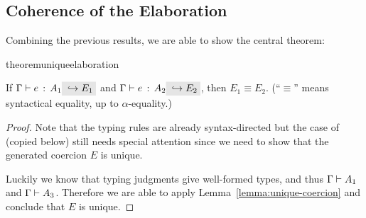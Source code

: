 %
%
%
%




\subsection{Coherence of the Elaboration}
Combining the previous results, we are able to show the central theorem:

\begin{restatable}{theorem}{uniqueelaboration}
  \label{theorem:unique-elaboration}

  If $\jtype \Gamma e {A_1} \yields {E_1}$ and $\jtype \Gamma e {A_2} \yields
  {E_2}$, then $E_1 \equiv E_2$. (``$\equiv$'' means syntactical equality, up to
  $\alpha$-equality.)

\end{restatable}

\begin{proof}
  Note that the typing rules are already syntax-directed but the case of
   (copied below) still needs special attention since we
  need to show that the generated coercion $E$ is unique.
  \begin{mathpar}
  \end{mathpar}
  Luckily we know that typing
  judgments give well-formed types, and thus $\jwf \Gamma {A_1}$ and $\jwf
  \Gamma {A_3}$. Therefore we are able to apply
  Lemma~\ref{lemma:unique-coercion} and conclude that $E$ is unique.

\end{proof}
